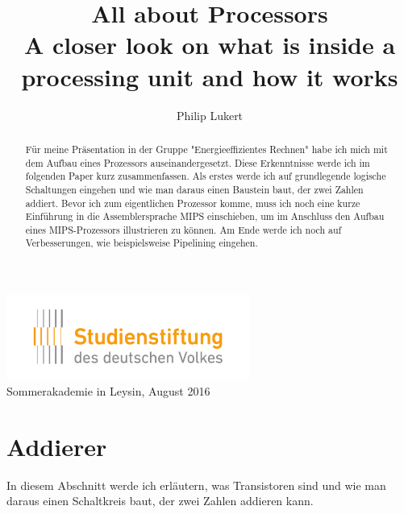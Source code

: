 \documentclass[12pt, a4paper]{article}
\begin{document}
\title{%
	{\bfseries All about Processors}\\[1ex] %
	{\large\bfseries A closer look on what is inside a processing unit and how it works} %
}
\author{Philip Lukert} %

\date{\vspace{-5ex}} %

{\sf \maketitle} %

\begin{center}
	\includegraphics[width=8cm]{logo_sdv.pdf}\\
	{\large\sf Sommerakademie in Leysin, August 2016}
\end{center}

\vspace{1cm}

\begin{abstract}
Für meine Präsentation in der Gruppe "Energieeffizientes Rechnen" habe ich mich mit dem Aufbau eines Prozessors auseinandergesetzt. Diese Erkenntnisse werde ich im folgenden Paper kurz zusammenfassen. Als erstes werde ich auf grundlegende logische Schaltungen eingehen und wie man daraus einen Baustein baut, der zwei Zahlen addiert. Bevor ich zum eigentlichen Prozessor komme, muss ich noch eine kurze Einführung in die Assemblersprache MIPS einschieben, um im Anschluss den Aufbau eines MIPS-Prozessors illustrieren zu können. Am Ende werde ich noch auf Verbesserungen, wie beispielsweise Pipelining eingehen.
\end{abstract}

\newpage
\tableofcontents
\newpage



\section{Addierer}
In diesem Abschnitt werde ich erläutern, was Transistoren sind und wie man daraus einen Schaltkreis baut, der zwei Zahlen addieren kann.
\end{document}
